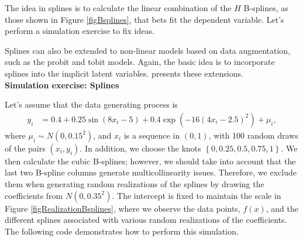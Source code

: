 The idea in splines is to calculate the linear combination of the $H$ B-splines, as those shown in Figure \ref{figBsplines}, that bets fit the dependent variable. Let's perform a simulation exercise to fix ideas.

Splines can also be extended to non-linear models based on data augmentation, such as the probit and tobit models. Again, the basic idea is to incorporate splines into the implicit latent variables. \cite[Chap.~10]{koop2003bayesian} presents these extensions.\\

\textbf{Simulation exercise: Splines}

Let's assume that the data generating process is
\begin{align*}
	y_i & = 0.4 + 0.25\sin(8x_i - 5) + 0.4\exp(-16(4x_i - 2.5)^2) + \mu_i,
\end{align*}
where $\mu_i \sim N(0,0.15^2)$, and $x_i$ is a sequence in $(0,1)$, with 100 random draws of the pairs $(x_i, y_i)$. In addition, we choose the knots $\left\{0, 0.25, 0.5, 0.75, 1\right\}$. We then calculate the cubic B-splines; however, we should take into account that the last two B-spline columns generate multicollinearity issues. Therefore, we exclude them when generating random realizations of the splines by drawing the coefficients from $N(0, 0.35^2)$. The intercept is fixed to maintain the scale in Figure \ref{figRealizationBsplines}, where we observe the data points, $f(x)$, and the different splines associated with various random realizations of the coefficients. The following code demonstrates how to perform this simulation.

